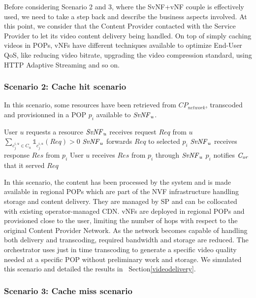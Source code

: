 Before considering Scenario 2 and 3, where the SvNF+vNF couple is effectively used, we need to take a step back and describe the business aspects involved. At this point, we consider that the Content Provider contacted with the Service Provider to let its video content delivery being handled. On top of simply caching videos in POPs, vNFs have different techniques available to optimize End-User QoS, like reducing video bitrate, upgrading the video compression standard, using HTTP Adaptive Streaming and so on.

\subsubsection*{Scenario 2: Cache hit scenario}

In this scenario, some resources have been retrieved from \(\mathit{CP}_{\mathit{network}}\), transcoded and provisionned in a POP $p_{i}$ available to $\mathit{SvNF}_{u}$.

\begin{algorithmic}[1]
	\STATE User $u$ requests a resource
\STATE $\mathit{SvNF}_{u}$ receives request $\mathit{Req}$ from $u$
\STATE \( \sum_{c^{i,u}_{j}\in C_{u}}{\mathbb{1}_{c^{i,u}_{j}}(\mathit{Req})}>0\)
\STATE $\mathit{SvNF}_{u}$ forwards $\mathit{Req}$ to selected $p_{i}$
\STATE $\mathit{SvNF}_{u}$ receives response $\mathit{Res}$ from $p_{i}$
\STATE User $u$ receives $\mathit{Res}$ from $p_{i}$ through $\mathit{SvNF}_{u}$
\STATE $p_{i}$ notifies $\mathit{C_{or}}$ that it served  $\mathit{Req}$
\end{algorithmic}


In this scenario, the content has been processed by the system and is made available in regional POPs which are part of the NVF infrastructure handling storage and content delivery.
They are managed by SP and can be collocated with existing operator-managed CDN.
vNFs are deployed in regional POPs and provisioned close to the user, limiting the number of hops with respect to the original Content Provider Network.
As the network becomes capable of handling both delivery and transcoding, required bandwidth and storage are reduced. The orchestrator uses just in time transcoding to generate a specific video quality needed at a specific POP without preliminary work and storage.
We simulated this scenario and detailed the results in ~Section\ref{videodelivery}.

\subsubsection*{Scenario 3: Cache miss scenario}

